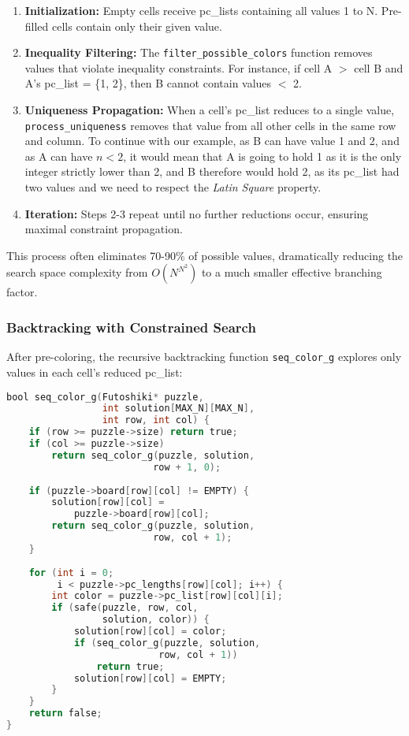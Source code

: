 \begin{enumerate}
    \item \textbf{Initialization:} Empty cells receive pc\_lists containing all values 1 to N. Pre-filled cells contain only their given value.
    
    \item \textbf{Inequality Filtering:} The \texttt{filter\_possible\_colors} function removes values that violate inequality constraints. For instance, if cell A $\gt$ cell B and A's pc\_list = \{1, 2\}, then B cannot contain values $\lt$ 2.
    
    \item \textbf{Uniqueness Propagation:} When a cell's pc\_list reduces to a single value, \texttt{process\_uniqueness} removes that value from all other cells in the same row and column. To continue with our example, as B can have value 1 and 2, and as A can have $n \lt 2$, it would mean that A is going to hold 1 as it is the only integer strictly lower than 2, and B therefore would hold 2, as its pc\_list had two values and we need to respect the \textit{Latin Square} property.
    
    \item \textbf{Iteration:} Steps 2-3 repeat until no further reductions occur, ensuring maximal constraint propagation.
\end{enumerate}

This process often eliminates 70-90\% of possible values, dramatically reducing the search space complexity from $O(N^{N^2})$ to a much smaller effective branching factor.

\subsubsection{Backtracking with Constrained Search}
\label{subsubsec:backtrack_with_csp}
After pre-coloring, the recursive backtracking function \texttt{seq\_color\_g} explores only values in each cell's reduced pc\_list:

\begin{lstlisting}[language=C, caption=Sequential backtracking core, label={listing:precoloring}]
bool seq_color_g(Futoshiki* puzzle, 
                 int solution[MAX_N][MAX_N], 
                 int row, int col) {
    if (row >= puzzle->size) return true;
    if (col >= puzzle->size) 
        return seq_color_g(puzzle, solution, 
                          row + 1, 0);
    
    if (puzzle->board[row][col] != EMPTY) {
        solution[row][col] = 
            puzzle->board[row][col];
        return seq_color_g(puzzle, solution, 
                          row, col + 1);
    }
    
    for (int i = 0; 
         i < puzzle->pc_lengths[row][col]; i++) {
        int color = puzzle->pc_list[row][col][i];
        if (safe(puzzle, row, col, 
                 solution, color)) {
            solution[row][col] = color;
            if (seq_color_g(puzzle, solution, 
                           row, col + 1))
                return true;
            solution[row][col] = EMPTY;
        }
    }
    return false;
}
\end{lstlisting}

